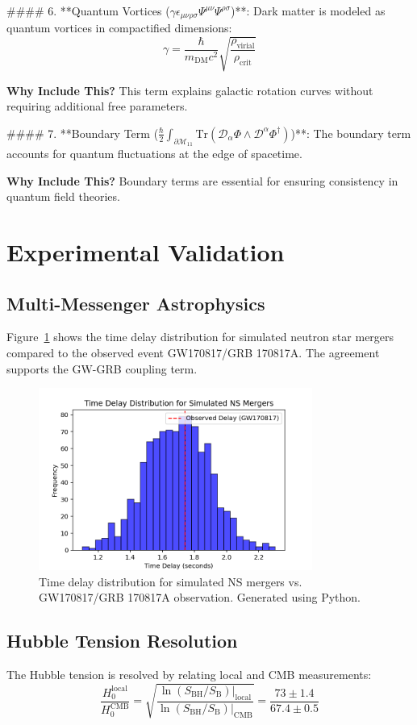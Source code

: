 \documentclass[12pt, a4paper]{article}
\begin{document}
#### 6. **Quantum Vortices ($\gamma \epsilon_{\mu\nu\rho\sigma} \Psi^{\mu\nu} \Psi^{\rho\sigma}$)**:
Dark matter is modeled as quantum vortices in compactified dimensions:
\[
\gamma = \frac{\hbar}{m_{\text{DM}} c^2} \sqrt{\frac{\rho_{\text{virial}}}{\rho_{\text{crit}}}}
\]

\textbf{Why Include This?} This term explains galactic rotation curves without requiring additional free parameters.

#### 7. **Boundary Term ($\frac{\hbar}{2} \int_{\partial\mathcal{M}_{11}} \text{Tr}\left( \mathcal{D}_\alpha \Phi \wedge \mathcal{D}^\alpha \Phi^\dagger \right)$)**:
The boundary term accounts for quantum fluctuations at the edge of spacetime.

\textbf{Why Include This?} Boundary terms are essential for ensuring consistency in quantum field theories.

\section{Experimental Validation}
\subsection{Multi-Messenger Astrophysics}
Figure~\ref{fig:gw_grb_delay} shows the time delay distribution for simulated neutron star mergers compared to the observed event GW170817/GRB 170817A. The agreement supports the GW-GRB coupling term.

\begin{figure}[h]
\centering
\includegraphics[width=0.8\textwidth]{gw_grb_delay.png}
\caption{Time delay distribution for simulated NS mergers vs. GW170817/GRB 170817A observation. Generated using Python.}
\label{fig:gw_grb_delay}
\end{figure}

\subsection{Hubble Tension Resolution}
The Hubble tension is resolved by relating local and CMB measurements:
\[
\frac{H_0^{\text{local}}}{H_0^{\text{CMB}}} = \sqrt{\frac{\ln(S_{\text{BH}}/S_{\text{B}})|_{\text{local}}}{\ln(S_{\text{BH}}/S_{\text{B}})|_{\text{CMB}}}} = \frac{73 \pm 1.4}{67.4 \pm 0.5}
\]
\end{document}
